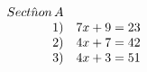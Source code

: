 \documentclass[preview]{standalone}
\begin{document}
\begin{align*}
\begin{array}{r l}{S e c t{\hat{n}}o n\,A}\\ {1)}&{{}7x+9=23}\\ {2)}&{{}4x+7=42}\\ {3)}&{{}4x+3=51}\end{array}
\end{align*}
\end{document}
